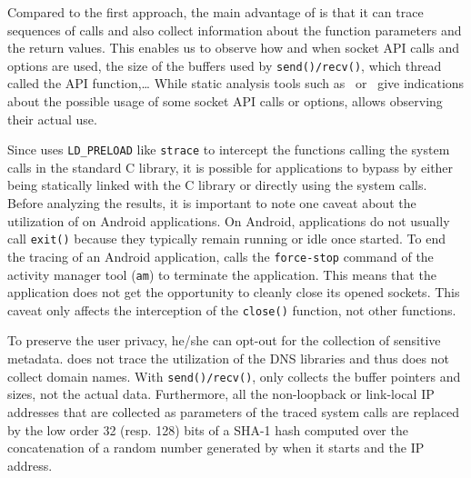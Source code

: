 Compared to the first approach, the main advantage of \tcpsnitch is
that it can trace sequences of calls and also collect information
about the function parameters and the return values. This enables us
to observe how and when socket API calls and options are used, the size of the
buffers used by \texttt{send()/recv()}, which thread called the API function,\ldots
While static analysis tools such as~\cite{Komu:Sockets} or~\cite{Tsai:LinuxAPI}
give indications about the possible usage of some socket API calls or options,
\tcpsnitch allows observing their actual use.

Since \tcpsnitch uses \texttt{LD\_PRELOAD} like \texttt{strace} to intercept
the functions calling the system calls in the standard
C library, it is possible for applications to bypass \tcpsnitch by
either being statically linked with the C library or directly using
the system calls. Before analyzing the results, it is important 
to note one caveat about the utilization of
\tcpsnitch on Android applications. On Android,
applications do not usually call \texttt{exit()} because they typically
remain running or idle once started. To end the tracing of an Android application,
\tcpsnitch calls the \texttt{force-stop} command of the activity
manager tool (\texttt{am}) to terminate the application. This means
that the application does not get the opportunity to cleanly close its
opened sockets. This caveat only affects the interception of the
\texttt{close()} function, not other functions.

To preserve the user privacy, he/she can opt-out for the collection of sensitive
metadata. \tcpsnitch does not trace the utilization of the DNS libraries and
thus does not collect domain names. With \texttt{send()/recv()},
\tcpsnitch only collects the buffer pointers and sizes, not the actual
data. Furthermore, all the non-loopback or link-local IP addresses that are
collected as parameters of the traced system calls are replaced by the low order
32 (resp. 128) bits of a SHA-1 hash computed over the concatenation of a
random number generated by \tcpsnitch when it starts and the IP address.
